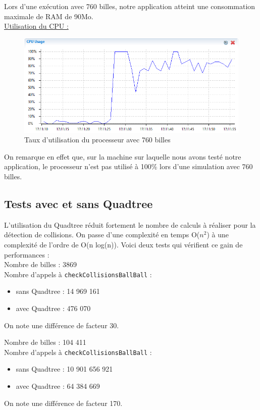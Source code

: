 \documentclass{report}
\begin{document}
Lors d’une exécution avec 760 billes, notre application atteint une consommation maximale de RAM de 90Mo. \\

\underline{Utilisation du CPU :}

\begin{figure}[H]
\centering
\includegraphics[scale=0.9]{timeline760_cpu.png}
\caption{Taux d'utilisation du processeur avec 760 billes}
\end{figure}

On remarque en effet que, sur la machine sur laquelle nous avons testé notre application, le processeur n’est pas utilisé à 100\% lors d’une simulation avec 760 billes.

\subsection{Tests avec et sans Quadtree}

L’utilisation du Quadtree réduit fortement le nombre de calculs à réaliser pour la détection de collisions. On passe d’une complexité en temps O(\(n^2\)) à une complexité de l’ordre de O(n log(n)). Voici deux tests qui vérifient ce gain de performances : \\

Nombre de billes : 3869\\

Nombre d’appels à \texttt{checkCollisionsBallBall} :
\begin{itemize}
\item sans Quadtree : 14 969 161
\item avec Quadtree : 476 070
\end{itemize}
On note une différence de facteur 30.

Nombre de billes : 104 411\\

Nombre d’appels à \texttt{checkCollisionsBallBall} :
\begin{itemize}
\item sans Quadtree : 10 901 656 921
\item avec Quadtree : 64 384 669
\end{itemize}
On note une différence de facteur 170.
\end{document}
